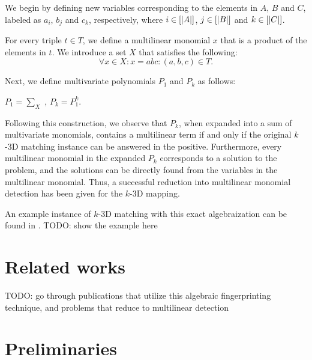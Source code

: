We begin by defining new variables corresponding to the elements in $A$, $B$ and $C$, 
labeled as $a_i$, $b_j$ and $c_k$, respectively, where $i\in [{\left\vert A\right\vert}]$, $j\in
[{\left\vert B\right\vert}]$ and $k\in [{\left\vert C\right\vert}]$. 

For every triple $t \in T$, we define a multilinear monomial $x$ that is a
product of the elements in $t$. 
We introduce a set $X$ that satisfies the following:
\[
\forall x \in X: x = abc : (a, b, c) \in T.
\]

Next, we define multivariate polynomials $P_1$ and $P_k$ as follows:
\begin{center}$P_1 = \displaystyle \sum_{X}$ ,   $P_k = P_1^k$.\end{center}

Following this construction, we observe that $P_k$, when expanded into a sum of multivariate monomials, 
contains a multilinear term if and only if the original $k$-3D matching instance can be answered in the positive. 
Furthermore, every multilinear monomial in the expanded $P_k$ corresponds to a solution to the problem, and 
the solutions can be directly found from the variables in the multilinear monomial. Thus, 
a successful reduction into multilinear monomial detection has been given for the $k$-3D mapping.

An example instance of $k$-3D matching with this exact algebraization can be found in \cite{KouWil15}. 
TODO: show the example here
\clearpage
\section{Related works} %
\label{sect:related_works}

TODO: go through publications that utilize this algebraic fingerprinting technique, 
and problems that reduce to multilinear detection
\clearpage

\section{Preliminaries}
\label{sect:prelims}

